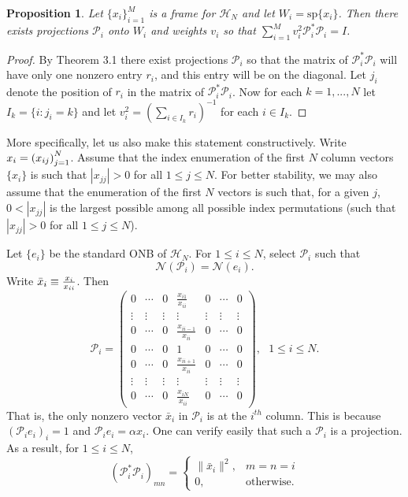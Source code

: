 \documentclass[11pt,reqno]{amsart}
\newtheorem{proposition}[thm]{Proposition}
\theoremstyle{remark}
\begin{document}
\begin{proposition}\label{prop_ConventionalFrame}
Let $\{x_i\}_{i=1}^M$ is a frame for $\mathcal{H}_N$ and let $W_i=\text{sp}\{x_i\}$.  Then there exists projections $\mathcal{P}_i$ onto $W_i$ and weights $v_i$ so that $\sum_{i=1}^Mv_i^2\mathcal{P}_i^*\mathcal{P}_i=I$.
\end{proposition}
\begin{proof}
By Theorem 3.1 there exist projections $\mathcal{P}_i$ so that the matrix of $\mathcal{P}_i^*\mathcal{P}_i$ will have only one nonzero entry $r_i$, and this entry will be on the diagonal.  Let $j_i$ denote the position of $r_i$ in the matrix of $\mathcal{P}_i^*\mathcal{P}_i$.  Now for each $k=1,...,N$ let $I_k=\{i:j_i=k\}$ and let $v_i^2=(\sum_{i\in I_k}r_i)^{-1}$ for each $i\in I_k$.
\end{proof}

More specifically, let us also make this statement constructively.  Write ${\displaystyle} x_i=\left(x_{ij}\right)^N_{j=1}$.  Assume that the index enumeration of the first $N$ column
vectors $\{x_i\}$ is such that $|x_{jj}| > 0$ for all $1\leq j\leq N$.
For better stability, we may also assume that the enumeration of the first $N$ vectors is such that, for a given $j$, $0< |x_{jj}|$ is the largest possible among all possible index permutations (such that $|x_{jj}| > 0$ for all $1\leq j\leq N$).

Let $\{e_i\}$ be the standard ONB of ${\mathcal H}_N$.  For $1\leq i\leq N$, select ${{\mathcal P}}_i$ such that
\begin{equation}\label{Pi_1}
{{\mathcal N}}({{\mathcal P}}_i)={{\mathcal N}}(e_i).
\end{equation}
Write ${\displaystyle}\bar x_i \equiv \frac{x_i}{x_{ii}}$.  Then
\begin{equation}\label{Pi_dim1}
{{\mathcal P}}_i=\left(\begin{array}{ccccccc}
0 & \cdots & 0 & \frac{x_{i1}}{x_{ii}} & 0 & \cdots & 0 \\
\vdots & \vdots & \vdots & \vdots & \vdots & \vdots & \vdots \\
0 & \cdots & 0 & \frac{x_{i i-1}}{x_{ii}} & 0 & \cdots & 0 \\
0 & \cdots & 0 & 1 & 0 & \cdots & 0 \\
0 & \cdots & 0 & \frac{x_{i i+1}}{x_{ii}} & 0 & \cdots & 0 \\
\vdots & \vdots & \vdots & \vdots & \vdots & \vdots & \vdots \\
0 & \cdots & 0 & \frac{x_{iN}}{x_{ii}} & 0 & \cdots & 0
             \end{array} \right), \ \ \ 1\leq i \leq N.
\end{equation}
That is, the only nonzero vector $\bar x_i$ in ${{\mathcal P}}_i$ is at the $i^{th}$ column.  This is because $({{\mathcal P}}_i e_i)_i=1$ and ${{\mathcal P}}_i e_i =\alpha x_i$.  One can verify easily that such a ${{\mathcal P}}_i$ is a projection.  As a result, for $1\leq i\leq N$,
\[
\left({{\mathcal P}}^*_i{{\mathcal P}}_i\right)_{mn}=\left\{\begin{array}{ll}
  \|\bar x_i\|^2, & m=n=i \\
  0,              & \text{otherwise}.\end{array}\right.
\]
\smallskip
\end{document}
